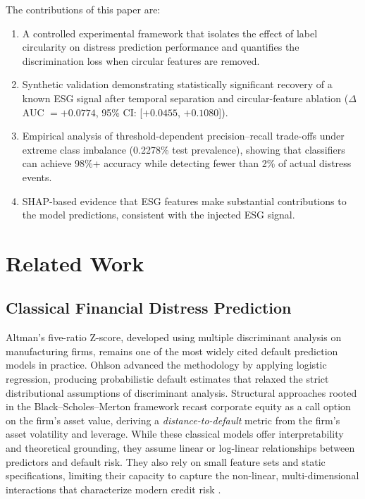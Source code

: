 \documentclass[sigconf,anonymous]{acmart}
\begin{document}
The contributions of this paper are:
\begin{enumerate}
    \item A controlled experimental framework that isolates the effect of label circularity on distress prediction performance and quantifies the discrimination loss when circular features are removed.
    \item Synthetic validation demonstrating statistically significant recovery of a known ESG signal after temporal separation and circular-feature ablation ($\Delta$AUC $= +0.0774$, 95\% CI: [$+0.0455$, $+0.1080$]).
    \item Empirical analysis of threshold-dependent precision--recall trade-offs under extreme class imbalance (0.2278\% test prevalence), showing that classifiers can achieve 98\%+ accuracy while detecting fewer than 2\% of actual distress events.
    \item SHAP-based evidence that ESG features make substantial contributions to the model predictions, consistent with the injected ESG signal.
\end{enumerate}


\section{Related Work}

\subsection{Classical Financial Distress Prediction}
Altman's \cite{altman1968} five-ratio Z-score, developed using multiple discriminant analysis on manufacturing firms, remains one of the most widely cited default prediction models in practice. Ohlson \cite{ohlson1980} advanced the methodology by applying logistic regression, producing probabilistic default estimates that relaxed the strict distributional assumptions of discriminant analysis. Structural approaches rooted in the Black--Scholes--Merton framework \cite{merton1974} recast corporate equity as a call option on the firm's asset value, deriving a \textit{distance-to-default} metric from the firm's asset volatility and leverage. While these classical models offer interpretability and theoretical grounding, they assume linear or log-linear relationships between predictors and default risk. They also rely on small feature sets and static specifications, limiting their capacity to capture the non-linear, multi-dimensional interactions that characterize modern credit risk \cite{jones2017}.
\end{document}
